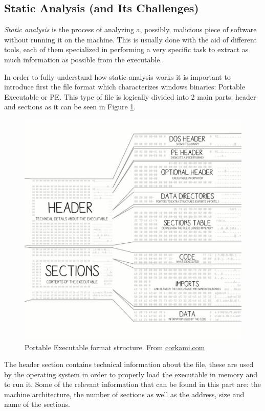 \subsection*{Static Analysis (and Its Challenges)}

\textit{Static analysis} is the process of analyzing a, possibly, malicious piece of software without running it on the machine. This is usually done with the aid of different tools, each of them specialized in performing a very specific task to extract as much information as possible from the executable. 

In order to fully understand how static analysis works it is important to introduce first the file format which characterizes windows binaries: Portable Executable or PE. This type of file is logically divided into 2 main parts: header and sections as it can be seen in Figure \ref{fig:pe}.

\begin{figure}[htp]
\centering
\includegraphics[width=\linewidth]{images/pediv.png}
\caption{Portable Executable format structure. From \url{corkami.com}}
\label{fig:pe}
\end{figure}

The header section contains technical information about the file, these are used by the operating system in order to properly load the executable in memory and to run it. Some of the relevant information that can be found in this part are: the machine architecture, the number of sections as well as the address, size and name of the sections.

